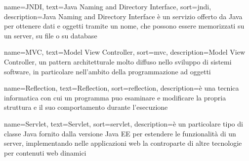 {
    name=JNDI,
    text=Java Naming and Directory Interface,
    sort=jndi,
    description={Java Naming and Directory Interface è un servizio offerto da Java per ottenere dati e oggetti tramite un nome, che possono essere memorizzati su un server, su file o su database}
}

{
    name=MVC,
    text=Model View Controller,
    sort=mvc,
    description={Model View Controller, un pattern architetturale molto diffuso nello sviluppo di sistemi software, in particolare nell’ambito della programmazione ad oggetti}
}

{
    name=Reflection,
    text=Reflection,
    sort=reflection,
    description={è una tecnica informatica con cui un programma puo esaminare e modificare la propria struttura e il suo comportamento durante l'esecuzione}
}

{
    name=Servlet,
    text=Servlet,
    sort=servlet,
    description={è un particolare tipo di classe Java fornito dalla versione Java EE per estendere le funzionalità di un server, implementando nelle applicazioni web la controparte	di altre tecnologie per contenuti web dinamici}
}